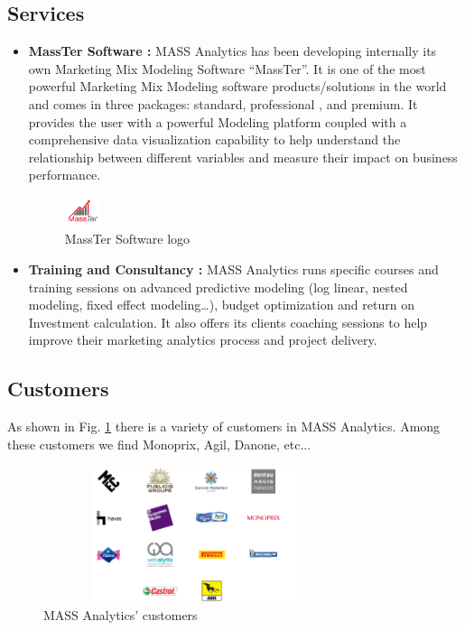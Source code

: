 	\subsection{Services}
	\begin{itemize}
		\item \textbf{MassTer Software :} MASS Analytics has been developing internally its own Marketing Mix Modeling Software ``MassTer''. It is one of the most powerful Marketing Mix Modeling software products/solutions in the world and comes in three packages: standard, professional , and premium. It provides the user with a powerful Modeling platform coupled with a comprehensive data visualization capability to help understand the relationship between different variables and measure their impact on business performance.
		\begin{figure}[h]
			\centering
			\includegraphics[width=0.1\textwidth]{massTer_logo.png}
			\caption{MassTer Software logo}
		\end{figure}
		
		\item \textbf{Training and Consultancy :} MASS Analytics runs specific courses and training sessions on advanced predictive modeling (log linear, nested modeling, fixed effect modeling…), budget optimization and return on Investment calculation. It also offers its clients coaching sessions to help improve their marketing analytics process and project delivery.
	\end{itemize}

	\subsection{Customers}
	As shown in Fig. \ref{customersLogo} there is a variety of  customers in MASS Analytics. Among these customers  we find Monoprix, Agil, Danone, etc...
		\begin{figure}[!h]
		\centering
		\includegraphics[width=9cm,height=4cm]{customers_logo.png}
		\caption[MASS Analytics’ customers]{MASS Analytics’ customers \cite{ref2}}
		\label{customersLogo}
	\end{figure}

